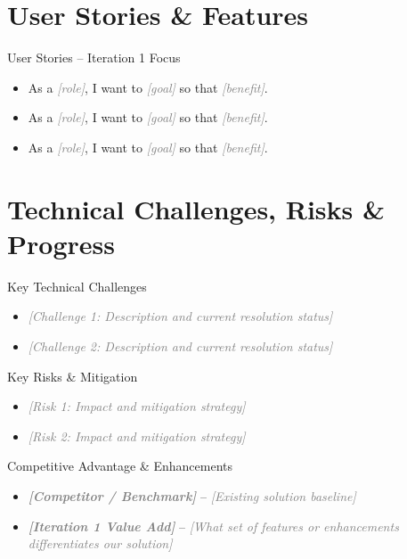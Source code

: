 \documentclass[11pt,aspectratio=169]{beamer}
\newcommand{\iterationNumber}{1} %
\newcommand{\fillin}[1]{\textcolor{gray}{\itshape [#1]}}
\begin{document}
\section{User Stories \& Features}

\begin{frame}{User Stories -- Iteration \iterationNumber{} Focus}
\begin{itemize}
  \item As a \fillin{role}, I want to \fillin{goal} so that \fillin{benefit}.
  \item As a \fillin{role}, I want to \fillin{goal} so that \fillin{benefit}.
  \item As a \fillin{role}, I want to \fillin{goal} so that \fillin{benefit}.
\end{itemize}
\end{frame}

\section{Technical Challenges, Risks \& Progress}

\begin{frame}{Key Technical Challenges}
\begin{itemize}
  \item \fillin{Challenge 1: Description and current resolution status}
  \item \fillin{Challenge 2: Description and current resolution status}
\end{itemize}
\end{frame}

\begin{frame}{Key Risks \& Mitigation}
\begin{itemize}
  \item \fillin{Risk 1: Impact and mitigation strategy}
  \item \fillin{Risk 2: Impact and mitigation strategy}
\end{itemize}
\end{frame}

\begin{frame}{Competitive Advantage \& Enhancements}
\begin{itemize}
  \item \textbf{\fillin{Competitor / Benchmark}} -- \fillin{Existing solution baseline}
  \item \textbf{\fillin{Iteration \iterationNumber{} Value Add}} -- \fillin{What set of features or enhancements differentiates our solution}
\end{itemize}
\end{frame}
\end{document}
